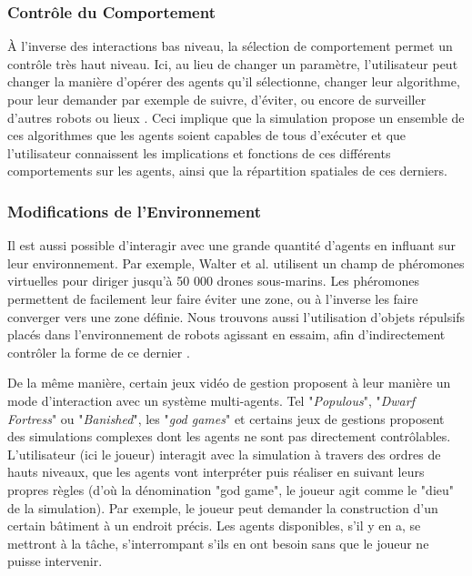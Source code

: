 	\subsubsection{Contrôle du Comportement}
	À l'inverse des interactions bas niveau, la sélection de comportement permet un contrôle très haut niveau. Ici, au lieu de changer un paramètre, l'utilisateur peut changer la manière d'opérer des agents qu'il sélectionne, changer leur algorithme, pour leur demander par exemple de suivre, d'éviter, ou encore de surveiller d'autres robots ou lieux \cite{coppin_controlling_2012}. Ceci implique que la simulation propose un ensemble de ces algorithmes que les agents soient capables de tous d'exécuter et que l'utilisateur connaissent les implications et fonctions de ces différents comportements sur les agents, ainsi que la répartition spatiales de ces derniers.
	
		
		
	\subsubsection{Modifications de l'Environnement}
		Il est aussi possible d'interagir avec une grande quantité d'agents en influant sur leur environnement. Par exemple, Walter et al. \cite{walter_uav_2006} utilisent un champ de phéromones virtuelles pour diriger jusqu'à 50 000 drones sous-marins. Les phéromones permettent de facilement leur faire éviter une zone, ou à l'inverse les faire converger vers une zone définie. Nous trouvons aussi l'utilisation d'objets répulsifs placés dans l'environnement de robots agissant en essaim, afin d'indirectement contrôler la forme de ce dernier \cite{jung_multi-robot_2013}.	
	
		De la même manière, certain jeux vidéo de gestion proposent à leur manière un mode d'interaction avec un système multi-agents. Tel "\textit{Populous}", "\textit{Dwarf Fortress}" ou "\textit{Banished}", les "\textit{god games}" et certains jeux de gestions proposent des simulations complexes dont les agents ne sont pas directement contrôlables. L'utilisateur (ici le joueur) interagit avec la simulation à travers des ordres de hauts niveaux, que les agents vont interpréter puis réaliser en suivant leurs propres règles (d'où la dénomination "god game", le joueur agit comme le "dieu" de la simulation). Par exemple, le joueur peut demander la construction d'un certain bâtiment à un endroit précis. Les agents disponibles, s'il y en a, se mettront à la tâche, s'interrompant s'ils en ont besoin sans que le joueur ne puisse intervenir. 
		
